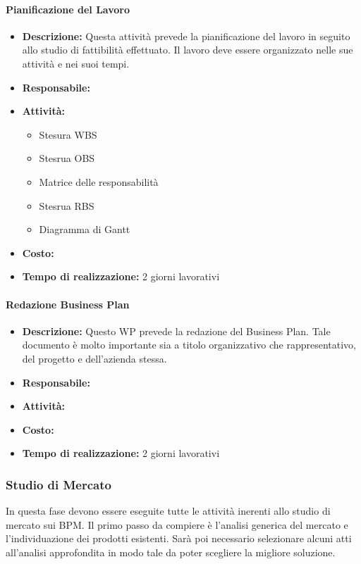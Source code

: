 \paragraph{Pianificazione del Lavoro}
\begin{itemize}
\item{\bfseries Descrizione:} Questa attività prevede la pianificazione del lavoro in seguito allo studio di fattibilità effettuato. Il lavoro deve essere organizzato nelle sue attività e nei suoi tempi.
\item {\bfseries Responsabile:}
\item  {\bfseries Attività:}
	\begin{itemize}
		\item Stesura WBS
		\item Stesrua OBS
		\item Matrice delle responsabilità
		\item Stesrua RBS
		\item Diagramma di Gantt	
	\end{itemize}

\item  {\bfseries Costo:}
\item  {\bfseries Tempo di realizzazione:} 2 giorni lavorativi
\end{itemize}


\paragraph{Redazione Business Plan}
\begin{itemize}
\item{\bfseries Descrizione:} Questo WP prevede la redazione del Business Plan. Tale documento è molto importante sia a titolo organizzativo che rappresentativo, del progetto e dell'azienda stessa.
\item {\bfseries Responsabile:}
\item  {\bfseries Attività:}
\item  {\bfseries Costo:}
\item  {\bfseries Tempo di realizzazione:} 2 giorni lavorativi
\end{itemize}


\subsubsection{Studio di Mercato}
In questa fase devono essere eseguite tutte le attività inerenti allo studio di mercato sui  BPM.
Il primo passo da compiere è l'analisi generica del mercato e l'individuazione dei prodotti esistenti. Sarà poi necessario selezionare alcuni  atti all'analisi approfondita in modo tale da poter scegliere la migliore soluzione. 

